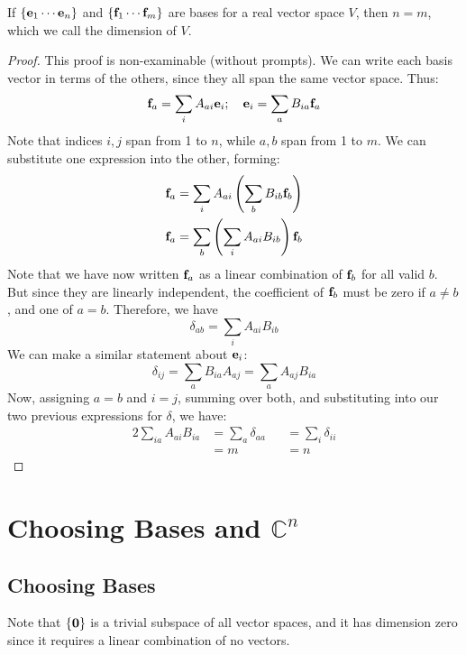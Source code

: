 \documentclass{article}
\begin{document}
\begin{theorem}
	If $\{\vb e_1 \cdots \vb e_n \}$ and $\{ \vb f_1 \cdots \vb f_m \}$ are bases for a real vector space $V$, then $n=m$, which we call the dimension of $V$.
\end{theorem}
\begin{proof}
	This proof is non-examinable (without prompts). We can write each basis vector in terms of the others, since they all span the same vector space. Thus:
	\[ \vb f_a = \sum_i A_{ai} \vb e_i;\quad \vb e_i = \sum_a B_{ia} \vb f_a \]
	Note that indices $i,j$ span from 1 to $n$, while $a,b$ span from 1 to $m$. We can substitute one expression into the other, forming:
	\begin{align*}
		\vb f_a & = \sum_i A_{ai} \left( \sum_b B_{ib}\vb f_b \right)  \\
		\vb f_a & = \sum_b \left( \sum_i A_{ai} B_{ib} \right) \vb f_b
	\end{align*}
	Note that we have now written $\vb f_a$ as a linear combination of $\vb f_b$ for all valid $b$. But since they are linearly independent, the coefficient of $\vb f_b$ must be zero if $a \neq b$, and one of $a = b$. Therefore, we have
	\[ \delta_{ab} = \sum_i A_{ai} B_{ib} \]
	We can make a similar statement about $\vb e_i$:
	\[ \delta_{ij} = \sum_a B_{ia} A_{aj} = \sum_a A_{aj} B_{ia} \]
	Now, assigning $a=b$ and $i=j$, summing over both, and substituting into our two previous expressions for $\delta$, we have:
	\begin{alignat}{2}
		\sum_{ia} A_{ai} B_{ia} & = \sum_a \delta_{aa} &  & = \sum_i \delta_{ii} \\
		                        & = m                  &  & = n
	\end{alignat}
\end{proof}

\section{Choosing Bases and $\mathbb C^n$}
\subsection{Choosing Bases}
Note that $\{ \vb 0 \}$ is a trivial subspace of all vector spaces, and it has dimension zero since it requires a linear combination of no vectors.
\end{document}
